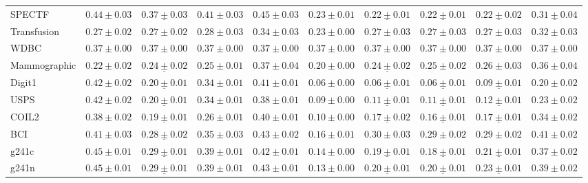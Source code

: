 \begin{table}
\begin{tabular}{l|lllllllll}
SPECTF & $0.44 \pm 0.03$& $\mathbf{\underline{0.37 \pm 0.03}} $& $\mathbf{0.41 \pm 0.03} $& $0.45 \pm 0.03$& $0.23 \pm 0.01$& $\mathbf{\underline{0.22 \pm 0.01}} $& $\mathbf{\underline{0.22 \pm 0.01}} $& $\mathbf{\underline{0.22 \pm 0.02}} $& $\mathbf{\underline{0.31 \pm 0.04}} $\\ 
Transfusion & $0.27 \pm 0.02$& $0.27 \pm 0.02$& $0.28 \pm 0.03$& $0.34 \pm 0.03$& $0.23 \pm 0.00$& $0.27 \pm 0.03$& $0.27 \pm 0.03$& $0.27 \pm 0.03$& $0.32 \pm 0.03$\\ 
WDBC & $0.37 \pm 0.00$& $0.37 \pm 0.00$& $\mathbf{0.37 \pm 0.00} $& $0.37 \pm 0.00$& $0.37 \pm 0.00$& $0.37 \pm 0.00$& $0.37 \pm 0.00$& $\mathbf{0.37 \pm 0.00} $& $0.37 \pm 0.00$\\ 
Mammographic & $0.22 \pm 0.02$& $\underline{0.24 \pm 0.02}$& $0.25 \pm 0.01$& $0.37 \pm 0.04$& $0.20 \pm 0.00$& $\underline{0.24 \pm 0.02}$& $0.25 \pm 0.02$& $0.26 \pm 0.03$& $0.36 \pm 0.04$\\ 
Digit1 & $0.42 \pm 0.02$& $\mathbf{\underline{0.20 \pm 0.01}} $& $\mathbf{0.34 \pm 0.01} $& $\mathbf{0.41 \pm 0.01} $& $0.06 \pm 0.00$& $\mathbf{\underline{0.06 \pm 0.01}} $& $\mathbf{\underline{0.06 \pm 0.01}} $& $\mathbf{\underline{0.09 \pm 0.01}} $& $\mathbf{0.20 \pm 0.02} $\\ 
USPS & $0.42 \pm 0.02$& $\mathbf{\underline{0.20 \pm 0.01}} $& $\mathbf{0.34 \pm 0.01} $& $\mathbf{0.38 \pm 0.01} $& $0.09 \pm 0.00$& $\mathbf{\underline{0.11 \pm 0.01}} $& $\mathbf{\underline{0.11 \pm 0.01}} $& $\mathbf{\underline{0.12 \pm 0.01}} $& $\mathbf{0.23 \pm 0.02} $\\ 
COIL2 & $0.38 \pm 0.02$& $\mathbf{\underline{0.19 \pm 0.01}} $& $\mathbf{0.26 \pm 0.01} $& $0.40 \pm 0.01$& $0.10 \pm 0.00$& $\mathbf{\underline{0.17 \pm 0.02}} $& $\mathbf{\underline{0.16 \pm 0.01}} $& $\mathbf{\underline{0.17 \pm 0.01}} $& $\mathbf{0.34 \pm 0.02} $\\ 
BCI & $0.41 \pm 0.03$& $\mathbf{\underline{0.28 \pm 0.02}} $& $\mathbf{0.35 \pm 0.03} $& $0.43 \pm 0.02$& $0.16 \pm 0.01$& $\mathbf{0.30 \pm 0.03} $& $\mathbf{0.29 \pm 0.02} $& $\mathbf{0.29 \pm 0.02} $& $0.41 \pm 0.02$\\ 
g241c & $0.45 \pm 0.01$& $\mathbf{\underline{0.29 \pm 0.01}} $& $\mathbf{0.39 \pm 0.01} $& $\mathbf{0.42 \pm 0.01} $& $0.14 \pm 0.00$& $\mathbf{\underline{0.19 \pm 0.01}} $& $\mathbf{\underline{0.18 \pm 0.01}} $& $\mathbf{\underline{0.21 \pm 0.01}} $& $\mathbf{0.37 \pm 0.02} $\\ 
g241n & $0.45 \pm 0.01$& $\mathbf{\underline{0.29 \pm 0.01}} $& $\mathbf{0.39 \pm 0.01} $& $\mathbf{0.43 \pm 0.01} $& $0.13 \pm 0.00$& $\mathbf{\underline{0.20 \pm 0.01}} $& $\mathbf{\underline{0.20 \pm 0.01}} $& $\mathbf{\underline{0.23 \pm 0.01}} $& $\mathbf{0.39 \pm 0.02} $\\ 
\end{tabular}
\end{table}
